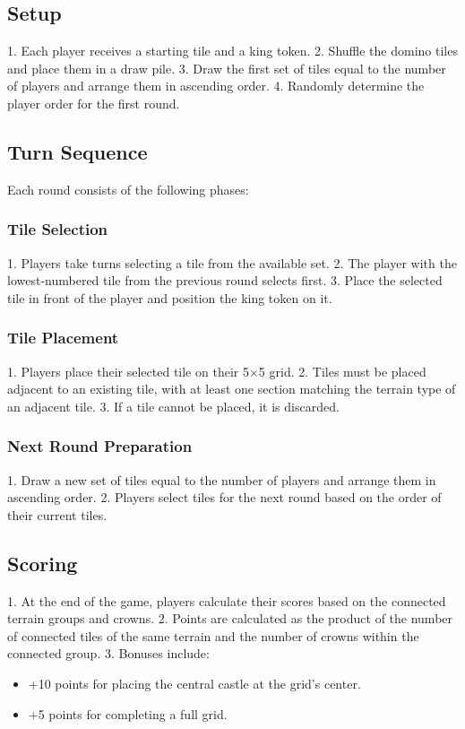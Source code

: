 \documentclass[conference]{IEEEtran}
\begin{document}
\subsection{Setup}
1. Each player receives a starting tile and a king token.
2. Shuffle the domino tiles and place them in a draw pile.
3. Draw the first set of tiles equal to the number of players and arrange them in ascending order.
4. Randomly determine the player order for the first round.

\subsection{Turn Sequence}
Each round consists of the following phases:

\subsubsection{Tile Selection}
1. Players take turns selecting a tile from the available set.
2. The player with the lowest-numbered tile from the previous round selects first.
3. Place the selected tile in front of the player and position the king token on it.

\subsubsection{Tile Placement}
1. Players place their selected tile on their 5$\times$5 grid.
2. Tiles must be placed adjacent to an existing tile, with at least one section matching the terrain type of an adjacent tile.
3. If a tile cannot be placed, it is discarded.

\subsubsection{Next Round Preparation}
1. Draw a new set of tiles equal to the number of players and arrange them in ascending order.
2. Players select tiles for the next round based on the order of their current tiles.

\subsection{Scoring}
1. At the end of the game, players calculate their scores based on the connected terrain groups and crowns.
2. Points are calculated as the product of the number of connected tiles of the same terrain and the number of crowns within the connected group.
3. Bonuses include:
   \begin{itemize}
       \item +10 points for placing the central castle at the grid's center.
       \item +5 points for completing a full grid.
   \end{itemize}
\end{document}
